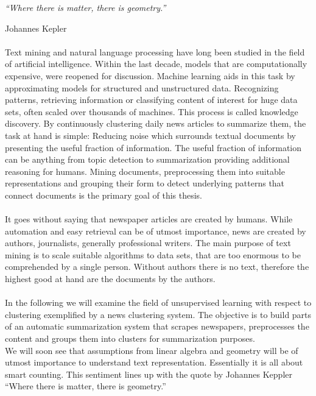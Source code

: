 \epigraph{\emph{
  ``Where there is matter, there is geometry.''
}}{ Johannes Kepler }

\paragraph{} Text mining and natural language processing have long been studied in the field of artificial intelligence. Within the last decade, models that are computationally expensive, were reopened for discussion. Machine learning aids in this task by approximating models for structured and unstructured data. Recognizing patterns, retrieving information or classifying content of interest for huge data sets, often scaled over thousands of machines. This process is called knowledge discovery. By continuously clustering daily news articles to summarize them, the task at hand is simple: Reducing noise which surrounds textual documents by presenting the useful fraction of information. The useful fraction of information can be anything from topic detection to summarization providing additional reasoning for humans. Mining documents, preprocessing them into suitable representations and grouping their form to detect underlying patterns that connect documents is the primary goal of this thesis.

\paragraph{} It goes without saying that newspaper articles are created by humans. While automation and easy retrieval can be of utmost importance, news are created by authors, journalists, generally professional writers. The main purpose of text mining is to scale suitable algorithms to data sets, that are too enormous to be comprehended by a single person. Without authors there is no text, therefore the highest good at hand are the documents by the authors.

\paragraph{} In the following we will examine the field of unsupervised learning with respect to clustering exemplified by a news clustering system. The objective is to build parts of an automatic summarization system that scrapes newspapers, preprocesses the content and groups them into clusters for summarization purposes.\\
We will soon see that assumptions from linear algebra and geometry will be of utmost importance to understand text representation. Essentially it is all about smart counting. This sentiment lines up with the quote by Johannes Keppler ``Where there is matter, there is geometry.''

